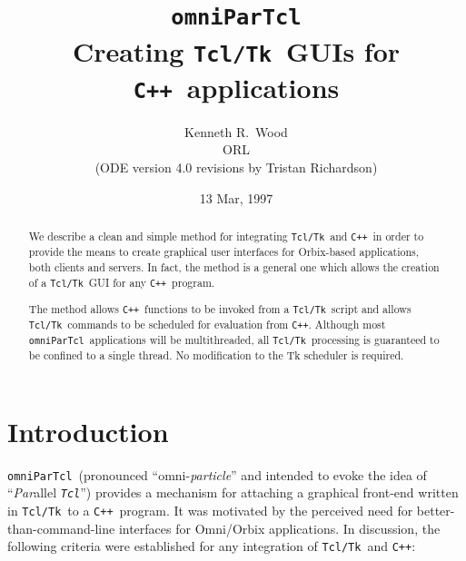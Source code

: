 \documentclass[11pt,twoside,onecolumn]{article}
\def\omniParTcl{{\tt omniParTcl}}
\def\tcltk{{\tt Tcl/Tk}}
\def\tcl{{\tt Tcl}}
\def\CXX{{\tt C++}}
\begin{document}
  
\title{{\bf \omniParTcl}\\
       {\normalsize Creating \tcltk\ GUIs for \CXX\ applications}}
\author{Kenneth R.\ Wood\\
        ORL\\
	{\small (ODE version 4.0 revisions by Tristan Richardson)}}
\date{13 Mar, 1997} 
\maketitle

\begin{abstract}
\noindent
We describe a clean and simple method for integrating \tcltk\ and \CXX\ 
in order to provide the means to create graphical user interfaces for
Orbix-based applications, both clients and servers.  In fact, the method
is a general one which allows the creation of a \tcltk\ GUI for any \CXX\ 
program.

The method allows \CXX\ functions to be invoked from a \tcltk\ script and
allows \tcltk\ commands to be scheduled for evaluation from \CXX.  
Although most \omniParTcl\ applications will be multithreaded,
all \tcltk\ processing is guaranteed to be confined to a single thread.
No modification to the Tk scheduler is required.
\end{abstract}

\section{Introduction}

\omniParTcl\ (pronounced ``omni-{\em particle}'' and intended to
evoke the idea of ``{\em Par\/}allel {\em \tcl\/}'') provides a mechanism
for attaching a graphical front-end written in \tcltk\ to a \CXX\ 
program.  It was motivated by the perceived need for
better-than-command-line interfaces for Omni/Orbix applications.  In
discussion, the following criteria were established for any integration
of \tcltk\ and \CXX:
\end{document}
